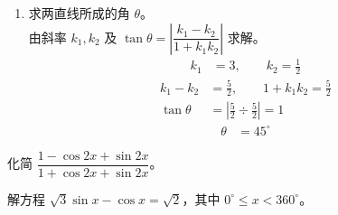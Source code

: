 \documentclass[12pt,a4paper]{exam-zh}
\begin{document}
\begin{solution}
\begin{enumerate}[label=(\alph*)]
        \item 求两直线所成的角 $\theta$。 \\
        由斜率 $k_1,k_2$ 及 $\tan\theta=\left|\dfrac{k_1-k_2}{1+k_1k_2}\right|$ 求解。 \\
        \begin{align*}
            k_1 &= 3, \qquad k_2 = \frac{1}{2}
        \end{align*}
        \begin{align*}
            k_1-k_2 &= \frac{5}{2}, \qquad 1+k_1k_2 = \frac{5}{2} \\
            \tan\theta &= \left|\frac{5}{2}\div\frac{5}{2}\right| = 1
        \end{align*}
        \begin{align*}
            \theta &= 45^{\circ}
        \end{align*}
    \end{enumerate}
\end{solution}

\begin{question}[points = 14]
    \begin{questionparts}
        \item 化简 $\dfrac{1-\cos 2x+\sin 2x}{1+\cos 2x+\sin 2x}$。 

        \item 解方程 $\sqrt{3}\sin x-\cos x=\sqrt{2}$，其中 $0^{\circ}\le x<360^{\circ}$。 
    \end{questionparts}
\end{question}
\end{document}
